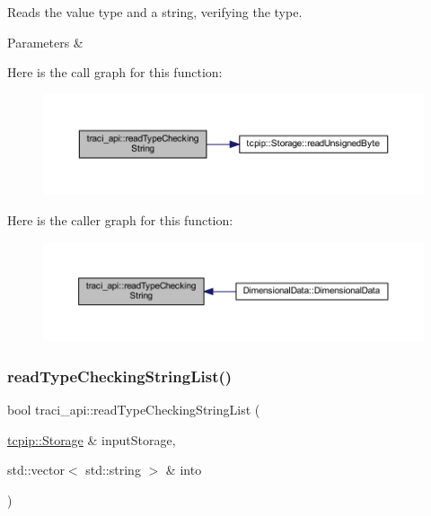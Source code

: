 Reads the value type and a string, verifying the type. 


\begin{DoxyParams}{Parameters}
{\em } & \\
\hline
\end{DoxyParams}
Here is the call graph for this function\+:
\nopagebreak
\begin{figure}[H]
\begin{center}
\leavevmode
\includegraphics[width=350pt]{namespacetraci__api_ac51a66efdbed4dcdcef596643fe387ec_cgraph}
\end{center}
\end{figure}
Here is the caller graph for this function\+:
\nopagebreak
\begin{figure}[H]
\begin{center}
\leavevmode
\includegraphics[width=350pt]{namespacetraci__api_ac51a66efdbed4dcdcef596643fe387ec_icgraph}
\end{center}
\end{figure}
\mbox{\label{namespacetraci__api_aa16305c07ac5f8221d9099f2e3a7531c}} 
\subsubsection{\texorpdfstring{read\+Type\+Checking\+String\+List()}{readTypeCheckingStringList()}}
{\footnotesize\ttfamily bool traci\+\_\+api\+::read\+Type\+Checking\+String\+List (\begin{DoxyParamCaption}\item[{\hyperlink{classtcpip_1_1_storage}{tcpip\+::\+Storage} \&}]{input\+Storage,  }\item[{std\+::vector$<$ std\+::string $>$ \&}]{into }\end{DoxyParamCaption})}




